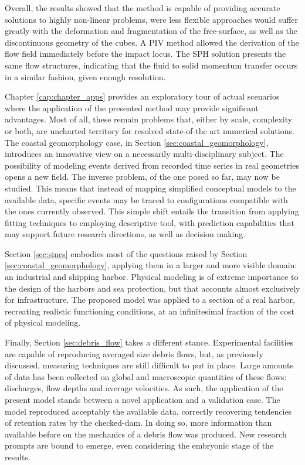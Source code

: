 Overall, the results showed that the method is capable of providing accurate solutions to highly non-linear problems, were less flexible approaches would suffer greatly with the deformation and fragmentation of the free-surface, as well as the discontinuous geometry of the cubes. A \ac{PIV} method allowed the derivation of the flow field immediately before the impact locus. The \ac{SPH} solution presents the same flow structures, indicating that the fluid to solid momentum transfer occurs in a similar fashion, given enough resolution.

Chapter \ref{cap:chapter_apps} provides an exploratory tour of actual scenarios where the application of the presented method may provide significant advantages. Most of all, these remain problems that, either by scale, complexity or both, are uncharted territory for resolved state-of-the art numerical solutions. The coastal geomorphology case, in Section \ref{sec:coastal_geomorphology}, introduces an innovative view on a necessarily multi-disciplinary subject. The possibility of modeling events derived from recorded time series in real geometries opens a new field. The inverse problem, of the one posed so far, may now be studied. This means that instead of mapping simplified conceptual models to the available data, specific events may be traced to configurations compatible with the ones currently observed. This simple shift entails the transition from applying fitting techniques to employing descriptive tool, with prediction capabilities that may support future research directions, as well as decision making.

Section \ref{sec:sines} embodies most of the questions raised by Section \ref{sec:coastal_geomorphology}, applying them in a larger and more visible domain: an industrial and shipping harbor. Physical modeling is of extreme importance to the design of the harbors and sea protection, but that accounts almost exclusively for infrastructure. The proposed model was applied to a section of a real harbor, recreating realistic functioning conditions, at an infinitesimal fraction of the cost of physical modeling. 

Finally, Section \ref{sec:debris_flow} takes a different stance. Experimental facilities are capable of reproducing averaged size debris flows, but, as previously discussed, measuring techniques are still difficult to put in place. Large amounts of data has been collected on global and macroscopic quantities of these flows: discharges, flow depths and average velocities. As such, the application of the present model stands between a novel application and a validation case. The model reproduced acceptably the available data, correctly recovering tendencies of retention rates by the checked-dam. In doing so, more information than available before on the mechanics of a debris flow was produced. New research prompts are bound to emerge, even considering the embryonic stage of the results.



